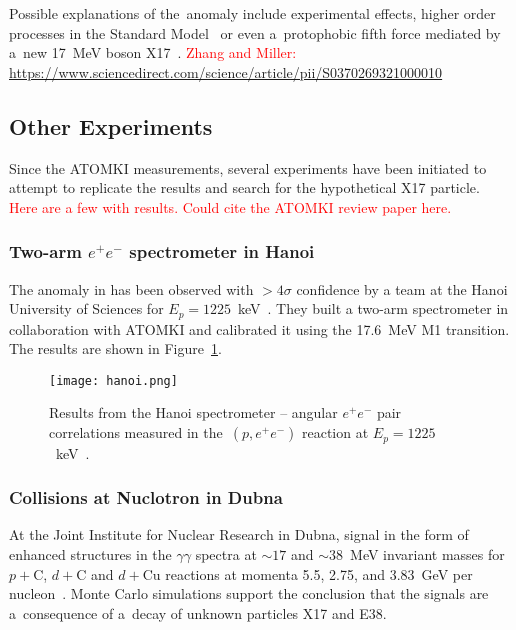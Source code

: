 				Possible explanations of the~anomaly include experimental effects, higher order processes in the Standard Model~\cite{kalman,aleksejevs} or even a~protophobic fifth force mediated by a~new 17~MeV boson X17~\cite{feng}. \textcolor{red}{Zhang and Miller: \url{https://www.sciencedirect.com/science/article/pii/S0370269321000010}}
		\subsection{Other Experiments}
			Since the ATOMKI measurements, several experiments have been initiated to attempt to replicate the results and search for the hypothetical X17 particle. \textcolor{red}{Here are a few with results. Could cite the ATOMKI review paper here.}
			
			\subsubsection{Two-arm $e^+e^-$ spectrometer in Hanoi}
				The anomaly in  has been observed with $>4\sigma$ confidence by a team at the Hanoi University of Sciences for $E_p = 1225$~keV~\cite{hanoi}. They built a two\nobreakdash-arm spectrometer in collaboration with ATOMKI and calibrated it using the 17.6~MeV M1 transition. The results are shown in Figure~\ref{fig:hanoi}.
				
				\begin{figure}
					\centering
					\texttt{[image: hanoi.png]}
					\caption{Results from the Hanoi spectrometer -- angular $e^+e^-$ pair correlations measured in the~$(p,e^+e^-)$ reaction at $E_p = 1225$~keV~\cite{hanoi}.}
					\label{fig:hanoi}
				\end{figure}
			
			\subsubsection{Collisions at Nuclotron in Dubna}
				At the Joint Institute for Nuclear Research in Dubna, signal in the form of enhanced structures in the $\gamma\gamma$ spectra at $\sim 17$ and $\sim 38$~MeV invariant masses for $p+\mathrm{C}$, $d+\mathrm{C}$ and $d+\mathrm{Cu}$ reactions at momenta 5.5, 2.75, and 3.83~GeV per nucleon~\cite{dubna}. Monte Carlo simulations support the conclusion that the signals are a~consequence of a~decay of unknown particles X17 and E38.
				
